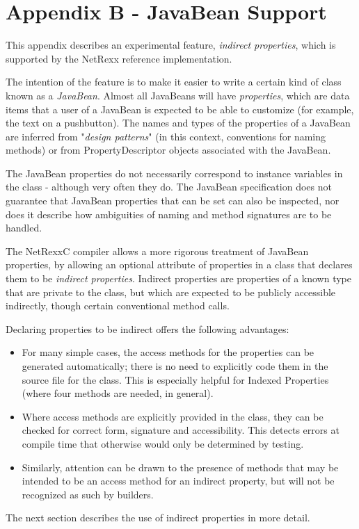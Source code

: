 \chapter{Appendix B - JavaBean Support}\label{refappb}
 
This appendix describes an experimental feature, \emph{indirect
properties}, which is supported by the NetRexx reference
implementation.
 
The intention of the feature is to make it easier to write a certain
kind of class known as a \emph{JavaBean}.
Almost all JavaBeans will have \emph{properties}, which are data items
that a user of a JavaBean is expected to be able to customize (for
example, the text on a pushbutton).  The names and types of the
properties of a JavaBean are inferred from "\emph{design
patterns}" (in this context, conventions for naming methods) or
from PropertyDescriptor objects associated with the JavaBean.
 
The JavaBean properties do not necessarily correspond to instance
variables in the class - although very often they do.  The
JavaBean specification does not guarantee that JavaBean properties
that can be set can also be inspected, nor does it describe how
ambiguities of naming and method signatures are to be handled.
 
The NetRexxC compiler
allows a more rigorous
treatment of JavaBean properties, by allowing an optional attribute of
properties in a class that declares them to be \emph{indirect
properties}.  Indirect properties are properties of a known type
that are private to the class, but which are expected to be publicly
accessible indirectly, though certain conventional method calls.
 
Declaring properties to be indirect offers the following advantages:
\begin{itemize}
\item For many simple cases, the access methods for the properties can be
generated automatically; there is no need to explicitly code them in the
source file for the class.  This is especially helpful for Indexed
Properties (where four methods are needed, in general).
\item Where access methods are explicitly provided in the class, they can
be checked for correct form, signature and accessibility.  This detects
errors at compile time that otherwise would only be determined by
testing.
\item Similarly, attention can be drawn to the presence of methods that
may be intended to be an access method for an indirect property, but
will not be recognized as such by builders.
\end{itemize}
 The next section describes the use of indirect properties in more
detail.
